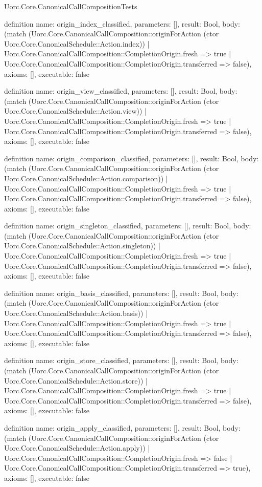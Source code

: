 \begin{lexlean}{Uorc.Core.CanonicalCallCompositionTests}
\begin{semanticmodule}
definition{
  name: origin_index_classified,
  parameters: [],
  result: Bool,
  body: (match (Uorc.Core.CanonicalCallComposition::originForAction (ctor Uorc.Core.CanonicalSchedule::Action.index))
    | Uorc.Core.CanonicalCallComposition::CompletionOrigin.fresh => true
    | Uorc.Core.CanonicalCallComposition::CompletionOrigin.transferred => false),
  axioms: [],
  executable: false
}

definition{
  name: origin_view_classified,
  parameters: [],
  result: Bool,
  body: (match (Uorc.Core.CanonicalCallComposition::originForAction (ctor Uorc.Core.CanonicalSchedule::Action.view))
    | Uorc.Core.CanonicalCallComposition::CompletionOrigin.fresh => true
    | Uorc.Core.CanonicalCallComposition::CompletionOrigin.transferred => false),
  axioms: [],
  executable: false
}

definition{
  name: origin_comparison_classified,
  parameters: [],
  result: Bool,
  body: (match (Uorc.Core.CanonicalCallComposition::originForAction (ctor Uorc.Core.CanonicalSchedule::Action.comparison))
    | Uorc.Core.CanonicalCallComposition::CompletionOrigin.fresh => true
    | Uorc.Core.CanonicalCallComposition::CompletionOrigin.transferred => false),
  axioms: [],
  executable: false
}

definition{
  name: origin_singleton_classified,
  parameters: [],
  result: Bool,
  body: (match (Uorc.Core.CanonicalCallComposition::originForAction (ctor Uorc.Core.CanonicalSchedule::Action.singleton))
    | Uorc.Core.CanonicalCallComposition::CompletionOrigin.fresh => true
    | Uorc.Core.CanonicalCallComposition::CompletionOrigin.transferred => false),
  axioms: [],
  executable: false
}

definition{
  name: origin_basis_classified,
  parameters: [],
  result: Bool,
  body: (match (Uorc.Core.CanonicalCallComposition::originForAction (ctor Uorc.Core.CanonicalSchedule::Action.basis))
    | Uorc.Core.CanonicalCallComposition::CompletionOrigin.fresh => true
    | Uorc.Core.CanonicalCallComposition::CompletionOrigin.transferred => false),
  axioms: [],
  executable: false
}

definition{
  name: origin_store_classified,
  parameters: [],
  result: Bool,
  body: (match (Uorc.Core.CanonicalCallComposition::originForAction (ctor Uorc.Core.CanonicalSchedule::Action.store))
    | Uorc.Core.CanonicalCallComposition::CompletionOrigin.fresh => true
    | Uorc.Core.CanonicalCallComposition::CompletionOrigin.transferred => false),
  axioms: [],
  executable: false
}

definition{
  name: origin_apply_classified,
  parameters: [],
  result: Bool,
  body: (match (Uorc.Core.CanonicalCallComposition::originForAction (ctor Uorc.Core.CanonicalSchedule::Action.apply))
    | Uorc.Core.CanonicalCallComposition::CompletionOrigin.fresh => false
    | Uorc.Core.CanonicalCallComposition::CompletionOrigin.transferred => true),
  axioms: [],
  executable: false
}


\end{semanticmodule}
\end{lexlean}
